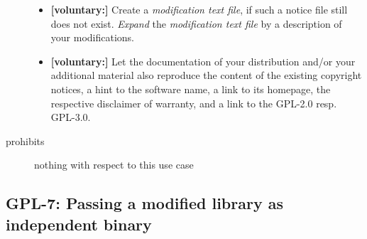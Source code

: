 \begin{description}
\begin{itemize}
  \item \textbf{[voluntary:]} Create a \emph{modification text file}, if such a
  notice file still does not exist. \emph{Expand} the \emph{modification text
  file} by a description of your modifications.
  
  \item \textbf{[voluntary:]} Let the documentation of your distribution and/or
  your additional material also reproduce the content of the existing
  copyright notices, a hint to the software name, a link to its homepage,
  the respective disclaimer of warranty, and a link to the GPL-2.0 resp.
  GPL-3.0.

\end{itemize}

\item[prohibits] nothing with respect to this use case

\end{description}


\subsection{GPL-7: Passing a modified library as independent binary}
\label{OSUC-08B-GPL}

